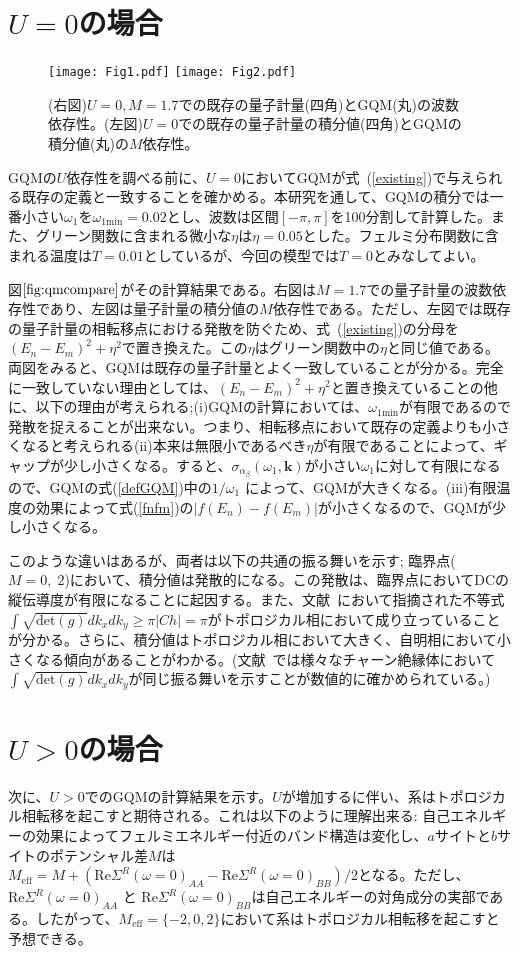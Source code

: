 \documentclass[12pt]{jsbook}
\newcommand{\bk}{\bm{k}}
\newcommand{\detg}{\int \sqrt{\mathrm{det}(g)}dk_xdk_y}
\begin{document}
\section{$U=0$の場合}
\begin{figure}
\centering
\texttt{[image: Fig1.pdf]}
\texttt{[image: Fig2.pdf]}
\caption{(右図)$U=0,M=1.7$での既存の量子計量(四角)とGQM(丸)の波数依存性。(左図)$U=0$での既存の量子計量の積分値(四角)とGQMの積分値(丸)の$M$依存性。}
\label{fig:qmcompare}
\end{figure}
GQMの$U$依存性を調べる前に、$U=0$においてGQMが式~(\ref{existing})で与えられる既存の定義と一致することを確かめる。本研究を通して、GQMの積分では一番小さい$\omega_1$を$\omega_{1\mathrm{min}} = 0.02$とし、波数は区間$[-\pi,\pi]$を100分割して計算した。また、グリーン関数に含まれる微小な$\eta$は$\eta = 0.05$とした。フェルミ分布関数に含まれる温度は$T=0.01$としているが、今回の模型では$T=0$とみなしてよい。 

図$\ref{fig:qmcompare}$がその計算結果である。右図は$M=1.7$での量子計量の波数依存性であり、左図は量子計量の積分値の$M$依存性である。ただし、左図では既存の量子計量の相転移点における発散を防ぐため、式~(\ref{existing})の分母を$(E_n-E_m)^2+\eta^2$で置き換えた。この$\eta$はグリーン関数中の$\eta$と同じ値である。両図をみると、GQMは既存の量子計量とよく一致していることが分かる。完全に一致していない理由としては、$(E_n-E_m)^2+\eta^2$と置き換えていることの他に、以下の理由が考えられる;(i)GQMの計算においては、$\omega_{1\mathrm{min}}$が有限であるので発散を捉えることが出来ない。つまり、相転移点において既存の定義よりも小さくなると考えられる(ii)本来は無限小であるべき$\eta$が有限であることによって、ギャップが少し小さくなる。すると、$\sigma_{\alpha_\beta}(\omega_1,\bk)$が小さい$\omega_1$に対して有限になるので、GQMの式(\ref{defGQM})中の$1/\omega_1$ によって、GQMが大きくなる。(iii)有限温度の効果によって式(\ref{fnfm})の$|f(E_n)-f(E_m)|$が小さくなるので、GQMが少し小さくなる。

このような違いはあるが、両者は以下の共通の振る舞いを示す; 臨界点($M=0,\;2$)において、積分値は発散的になる。この発散は、臨界点においてDCの縦伝導度が有限になることに起因する。また、文献~\cite{PhysRevB.104.045103}において指摘された不等式$\detg \geq \pi |Ch| = \pi$がトポロジカル相において成り立っていることが分かる。さらに、積分値はトポロジカル相において大きく、自明相において小さくなる傾向があることがわかる。(文献~\cite{PhysRevB.104.045103}では様々なチャーン絶縁体において$\detg$が同じ振る舞いを示すことが数値的に確かめられている。)
\section{$U>0$の場合}
次に、$U>0$でのGQMの計算結果を示す。$U$が増加するに伴い、系はトポロジカル相転移を起こすと期待される。これは以下のように理解出来る: 自己エネルギーの効果によってフェルミエネルギー付近のバンド構造は変化し、$a$サイトと$b$サイトのポテンシャル差$M$は$M_{\mathrm{eff}}=M+(\mathrm{Re}\Sigma^R(\omega = 0)_{AA}-\mathrm{Re}\Sigma^R(\omega = 0)_{BB})/2$となる。ただし、$\mathrm{Re}\Sigma^R(\omega = 0)_{AA}$ と $\mathrm{Re}\Sigma^R(\omega = 0)_{BB}$は自己エネルギーの対角成分の実部である。したがって、$M_{\mathrm{eff}}=\{-2,0,2\}$において系はトポロジカル相転移を起こすと予想できる。
\end{document}
